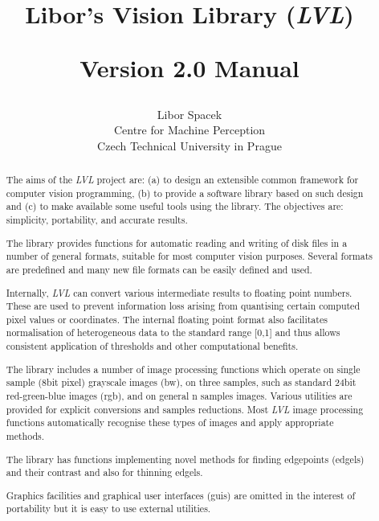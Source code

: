 \documentclass[11pt,twoside,english,a4paper]{article}
\begin{document}
\title{Libor's Vision Library (\emph{LVL})\\\begin{Large}Version 2.0 Manual\end{Large}}
\author{Libor Spacek\\Centre for Machine Perception\\Czech Technical University in Prague}
\maketitle
\begin{abstract}
\thispagestyle{empty}
The aims of the \emph{LVL} project are: (a) to design an extensible common framework for computer vision programming, (b) to provide a software library based on such design and (c) to make available some useful tools using the library. The objectives  are: simplicity, portability, and accurate results.

The library provides functions for automatic reading and writing of disk files
in a number of general formats, suitable for most computer vision purposes. 
Several formats are predefined and many new file formats can be easily defined and used. 

Internally, \emph{LVL} can convert various intermediate results to 
floating point numbers. These are used to prevent information loss arising from quantising certain computed pixel values or coordinates. The internal floating point format also facilitates 
normalisation of heterogeneous data to the standard range [0,1] and thus 
allows consistent application of thresholds and other computational benefits.

The library includes a number of image processing functions
which operate on single sample (8bit pixel) grayscale images (bw), 
on three samples, such as standard 24bit red-green-blue images (rgb), 
and on general n samples images. Various utilities are provided for explicit conversions and samples reductions. Most \emph{LVL} image processing functions automatically recognise these types of images and apply appropriate methods.

The  library has functions implementing novel methods for finding edgepoints (edgels) and their contrast and also for thinning edgels.

Graphics facilities and graphical user interfaces (guis) are omitted in the interest of portability but it is easy to use external utilities.
\pagebreak
\end {abstract}
\tableofcontents{}\pagebreak
\setlength{\parskip}{0.5\baselineskip}
\setlength{\parindent}{0pt}
\end{document}
